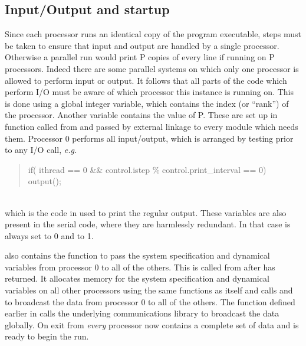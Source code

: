 \documentclass[a4paper,twoside]{report}
\newcommand{\eg}{\emph{e.g.}}
\begin{document}
\subsection{Input/Output and startup}
\label{sec:pario}

Since each processor runs an identical copy of the program executable,
steps must be taken to ensure that input and output are handled by a
single processor.  Otherwise a parallel run would print P copies of
every line if running on P processors.  Indeed there are some parallel
systems on which only one processor is allowed to perform input or
output. It follows that all parts of the code which perform I/O must
be aware of which processor this instance is running on.  This is done
using a global integer variable,  which contains
the index (or ``rank'') of the processor.  Another variable
 contains the value of P.  These are set up in
function  called from  and passed
by external linkage to every module which needs them.  Processor 0
performs all input/output, which is arranged by testing
 prior to any I/O call, \eg\\
\parbox{\textwidth}{%
\begin{quote}
  \Litf
      if( ithread == 0 \&\& control.istep \% control.print\_interval == 0)\\
\hspace*{1cm}          output();
\end{quote}}\\
which is the code in  used to print the regular output.
These variables are also present in the serial code, where they are
harmlessly redundant. In that case  is always set to 0
and  to 1.

 also contains the function  to
pass the system specification and dynamical variables from processor 0
to all of the others.  This is called from  after
 has returned.  It allocates memory for the system
specification and dynamical variables on all other processors using
the same functions as  itself and calls
 and  to broadcast the
data from processor 0 to all of the others.  The function
 defined earlier in 
calls the underlying communications library to broadcast the
data globally.  On exit from  \emph{every}
processor now contains a complete set of data and is ready to begin
the run.
\end{document}
